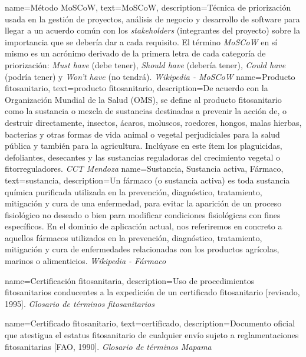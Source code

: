 {
    name={Método MoSCoW},
    text={MoSCoW},
    description={Técnica de priorización usada en la gestión de proyectos, análisis de negocio y desarrollo de software para llegar a un acuerdo común con los \textit{stakeholders} (integrantes del proyecto) sobre la importancia que se debería dar a cada requisito. El término \textit{MoSCoW} en sí mismo es un acrónimo derivado de la primera letra de cada categoría de priorización: \textit{Must have} (debe tener), \textit{Should have} (debería tener), \textit{Could have} (podría tener) y \textit{Won't have} (no tendrá). \textit{Wikipedia - MoSCoW} \cite{wikimoscow}}
}
{
    name={Producto fitosanitario},
    text={producto fitosanitario},
    description={De acuerdo con la Organización Mundial de la Salud (OMS), se define al producto fitosanitario como la \gls{sustancia} o mezcla de sustancias destinadas a prevenir la acción de, o destruir directamente, insectos, ácaros, moluscos, roedores, hongos, malas hierbas, bacterias y otras formas de vida animal o vegetal perjudiciales para la salud pública y también para la agricultura. Inclúyase en este ítem los plaguicidas, defoliantes, desecantes y las sustancias reguladoras del crecimiento vegetal o fitorreguladores. \textit{CCT Mendoza} \cite{cricyt}}
}
{
    name={Sustancia, Sustancia activa, Fármaco},
    text={sustancia},
    description={Un fármaco (o sustancia activa) es toda sustancia química purificada utilizada en la prevención, diagnóstico, tratamiento, mitigación y cura de una enfermedad, para evitar la aparición de un proceso fisiológico no deseado o bien para modificar condiciones fisiológicas con fines específicos. En el dominio de aplicación actual, nos referiremos en concreto a aquellos fármacos utilizados en la prevención, diagnóstico, tratamiento, mitigación y cura de enfermedades relacionadas con los productos agrícolas, marinos o alimenticios. \textit{Wikipedia - Fármaco} \cite{farmacowiki}}
}

{
    name={Certificación fitosanitaria},
    description={Uso de procedimientos fitosanitarios conducentes a la expedición de un certificado fitosanitario [revisado, 1995]. \textit{Glosario de términos fitosanitarios} \cite{glosarioterminosfito}}
}

{
    name={Certificado fitosanitario},
    text={certificado},
    description={Documento oficial que atestigua el estatus fitosanitario de cualquier envío sujeto a reglamentaciones fitosanitarias [FAO, 1990]. \textit{Glosario de términos Mapama} \cite{glosarioterminosmapama}}
}

